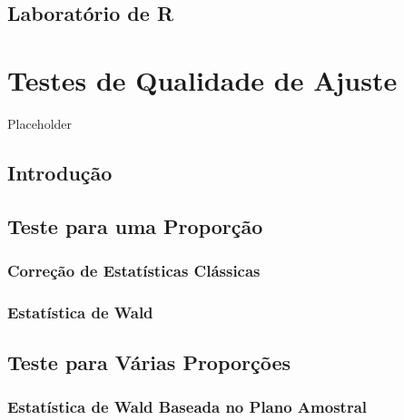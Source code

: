 \documentclass[
]{book}
\begin{document}
\hypertarget{laboratuxf3rio-de-r-3}{%
\section{Laboratório de R}\label{laboratuxf3rio-de-r-3}}

\hypertarget{testqualajust}{%
\chapter{Testes de Qualidade de Ajuste}\label{testqualajust}}

Placeholder

\hypertarget{introduuxe7uxe3o-1}{%
\section{Introdução}\label{introduuxe7uxe3o-1}}

\hypertarget{teste-para-uma-proporuxe7uxe3o}{%
\section{Teste para uma Proporção}\label{teste-para-uma-proporuxe7uxe3o}}

\hypertarget{correuxe7uxe3o-de-estatuxedsticas-cluxe1ssicas}{%
\subsection{Correção de Estatísticas Clássicas}\label{correuxe7uxe3o-de-estatuxedsticas-cluxe1ssicas}}

\hypertarget{estatuxedstica-de-wald}{%
\subsection{Estatística de Wald}\label{estatuxedstica-de-wald}}

\hypertarget{teste-para-vuxe1rias-proporuxe7uxf5es}{%
\section{Teste para Várias Proporções}\label{teste-para-vuxe1rias-proporuxe7uxf5es}}

\hypertarget{estatuxedstica-de-wald-baseada-no-plano-amostral}{%
\subsection{Estatística de Wald Baseada no Plano Amostral}\label{estatuxedstica-de-wald-baseada-no-plano-amostral}}
\end{document}
